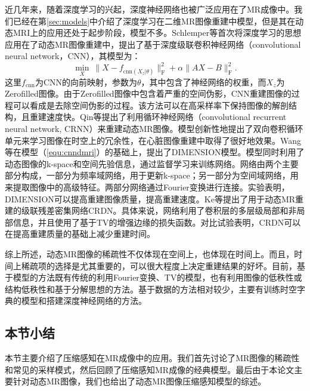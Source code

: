 近几年来，随着深度学习的兴起，深度神经网络也被广泛应用在了MR成像中。我们已经在第\ref{sec:models}中介绍了深度学习在二维MR图像重建中模型，但是其在动态MRI上的应用还处于起步阶段，模型不多。Schlemper等\cite{schlemper2017deep}首次将深度学习的思想应用在了动态MR图像重建中，提出了基于深度级联卷积神经网络（convolutional neural network，CNN），其模型为：
\begin{equation}
	\min_X \ \|X-f_{\mathrm{cnn}(X_z|\theta)}\|_\mathrm{F}^2+\alpha\|AX-B\|^2_\mathrm{F}.
	\label{equ:cnndmri}
\end{equation}
这里$f_{\mathrm{cnn}}$为CNN的向前映射，参数为$\theta$，其中包含了神经网络的权重，而$X_z$为Zerofilled图像。由于Zerofilled图像中包含着严重的空间伪影，CNN重建图像的过程可以看成是去除空间伪影的过程。该方法可以在高采样率下保持图像的解剖结构，且重建速度快。Qin等\cite{qin2018convolutional}提出了利用循环神经网络（convolutional recurrent neural network, CRNN）来重建动态MR图像。模型创新性地提出了双向卷积循环单元来学习图像在时空上的冗余性，在心脏图像重建中取得了很好地效果。Wang\cite{wang2018dimension}等在模型（\ref{equ:cnndmri}）的基础上，提出了DIMENSION模型。模型同时利用了动态图像的k-space和空间先验信息，通过监督学习来训练网络。网络由两个主要部分构成，一部分为频率域网络，用于更新k-space；另一部分为空间域网络，用来提取图像中的高级特征。两部分网络通过Fourier变换进行连接。实验表明，DIMENSION可以提高重建图像质量，提高重建速度。Ke等\cite{ke2019crdn}提出了用于动态MR重建的级联残差密集网络CRDN。具体来说，网络利用了卷积层的多层级局部和非局部信息，并且使用了基于TV的增强边缘的损失函数。对比试验表明，CRDN可以在提高重建质量的基础上减少重建时间。

综上所述，动态MR图像的稀疏性不仅体现在空间上，也体现在时间上。而且，时间上稀疏项的选择是尤其重要的，可以很大程度上决定重建结果的好坏。目前，基于模型的方法既有传统的利用Fourier变换、TV的模型，也有利用图像的低秩性或结构低秩性和基于分解思想的方法。基于数据的方法相对较少，主要有训练时空字典的模型和搭建深度神经网络的方法。

\subsection{本节小结}
本节主要介绍了压缩感知在MR成像中的应用。我们首先讨论了MR图像的稀疏性和常见的采样模式，然后回顾了压缩感知MR成像的经典模型。最后由于本论文主要针对动态MR图像，我们也给出了动态MR图像压缩感知模型的综述。

